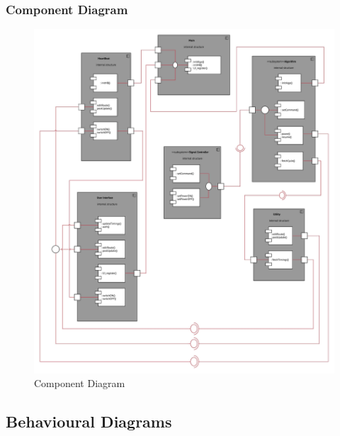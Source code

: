 \documentclass[12pt,a4paper,final]{report}
\begin{document}
\subsubsection{Component Diagram}
	\begin{figure}[!h]
		\begin{center}
			\includegraphics[scale=0.5]{Diagrams/Component_Diagram.jpeg}
		\end{center}
		\caption{Component Diagram}
	\end{figure}
\newpage
\subsection{Behavioural Diagrams}
\end{document}

